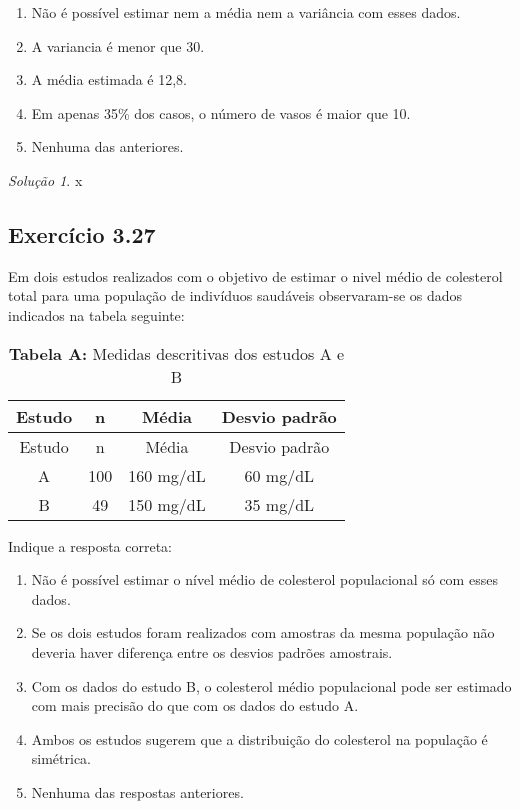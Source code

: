 \documentclass[
]{latex/krantz}
\providecommand{\tightlist}{%
  \setlength{\itemsep}{0pt}\setlength{\parskip}{0pt}}
\theoremstyle{definition}
\theoremstyle{definition}
\theoremstyle{definition}
\theoremstyle{definition}
\theoremstyle{remark}
\newtheorem*{solution}{Solução}
\begin{document}
\begin{enumerate}
\def\labelenumi{\alph{enumi})}
\tightlist
\item
  Não é possível estimar nem a média nem a variância com esses dados.
\item
  A variancia é menor que 30.
\item
  A média estimada é 12,8.
\item
  Em apenas 35\% dos casos, o número de vasos é maior que 10.
\item
  Nenhuma das anteriores.
\end{enumerate}

\begin{solution}
x
\end{solution}

\hypertarget{exr3-27}{%
\subsection*{Exercício 3.27}\label{exr3-27}}

Em dois estudos realizados com o objetivo de estimar o nivel médio de colesterol total para uma população de indivíduos saudáveis observaram-se os dados indicados na tabela seguinte:

\begin{longtable}[]{@{}cccc@{}}
\caption{\textbf{Tabela A:} Medidas descritivas dos estudos A e B}\tabularnewline
\toprule\noalign{}
Estudo & n & Média & Desvio padrão \\
\midrule\noalign{}
\endfirsthead
\toprule\noalign{}
Estudo & n & Média & Desvio padrão \\
\midrule\noalign{}
\endhead
\bottomrule\noalign{}
\endlastfoot
A & 100 & 160 mg/dL & 60 mg/dL \\
B & 49 & 150 mg/dL & 35 mg/dL \\
\end{longtable}

Indique a resposta correta:

\begin{enumerate}
\def\labelenumi{\alph{enumi})}
\tightlist
\item
  Não é possível estimar o nível médio de colesterol populacional só com esses dados.
\item
  Se os dois estudos foram realizados com amostras da mesma população não deveria haver diferença entre os desvios padrões amostrais.
\item
  Com os dados do estudo B, o colesterol médio populacional pode ser estimado com mais precisão do que com os dados do estudo A.
\item
  Ambos os estudos sugerem que a distribuição do colesterol na população é simétrica.
\item
  Nenhuma das respostas anteriores.
\end{enumerate}
\end{document}
